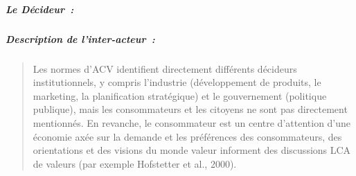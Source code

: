 % 
% 
% 
% 
% 


\subparagraph{Le Décideur~:}
\label{decideur}
 \subparagraph{Description de l'inter-acteur~:}
 \blockcquote[traduction]{murray_transdisciplinary_2015}{Les normes d'ACV identifient directement différents décideurs institutionnels, y compris l'industrie (développement de produits, le marketing, la planification stratégique) et le gouvernement (politique publique), mais les consommateurs et les citoyens ne sont pas directement mentionnés. En revanche, le consommateur est un centre d’attention d'une économie axée sur la demande et les préférences des consommateurs, des orientations et des visions du monde valeur informent des discussions LCA de valeurs (par exemple Hofstetter et al., 2000).}
 
